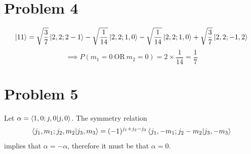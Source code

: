\documentclass[12pt]{article}
\begin{document}
\section*{Problem 4}
\[ \ket{1 1} = \sqrt{\frac{3}{7}}\ket{2, 2; 2 -1} - \sqrt{\frac{1}{14}}\ket{2,2;1,0} - \sqrt{\frac{1}{14}}\ket{2,2;1,0} + \sqrt{\frac{3}{7}}\ket{2,2;-1,2} \]
\[  \implies P(m_1=0 \:\text{OR}\: m_2=0) = 2\times\frac{1}{14} = \frac{1}{7} \]


\section*{Problem 5}
Let $\alpha = \braket{1,0;j,0}{j,0}$. The symmetry relation
\[ \braket{j_1, m_1; j_2, m_2}{j_3, m_3} = (-1)^{j_1 + j_2 - j_3}\braket{j_1, -m_1; j_2 -m_2}{j_3, -m_3} \]
implies that $\alpha = -\alpha$, therefore it must be that $\alpha = 0$.
\end{document}
